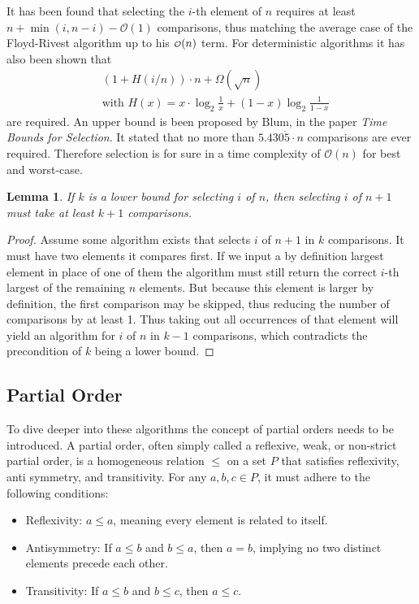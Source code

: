 \documentclass[10pt,journal,compsoc]{IEEEtran}
\newcommand\smallO{
  \mathchoice
    {{\scriptstyle\mathcal{O}}}%
    {{\scriptstyle\mathcal{O}}}%
    {{\scriptscriptstyle\mathcal{O}}}%
    {\scalebox{.50}{$\scriptscriptstyle\mathcal{O}$}}%
  }
\newtheorem{lemma}{Lemma}
\begin{document}
It has been found that selecting the $i$-th element of $n$ requires at least
$n+\min(i,n-i)-\mathcal{O}(1)$ comparisons, thus matching the average case of the Floyd-Rivest
algorithm up to his $\smallO(n)$ term. For deterministic algorithms it has also been shown that
\begin{eqnarray*}
  &\left (1 + H(i/n) \right ) \cdot n + \Omega(\sqrt n) \\
  &\text{with~} H(x) = x \cdot \log_2 \frac{1}{x} + (1-x) \log_2 \frac{1}{1-x}
\end{eqnarray*}
are required. An upper bound is been proposed by Blum, in the paper \textit{Time Bounds for
  Selection}. It stated that no more than $5.430\dot{5} \cdot n$ comparisons are ever required.
Therefore selection is for sure in a time complexity of $\mathcal{O}(n)$ for best and worst-case.

\begin{lemma}
  If $k$ is a lower bound for selecting $i$ of $n$, then selecting $i$ of $n+1$ must take at least $k+1$ comparisons.
\end{lemma}

\begin{proof}
  Assume some algorithm exists that selects $i$ of $n+1$ in $k$ comparisons. It must have two elements it compares first.
  If we input a by definition largest element in place of one of them the algorithm must still return the correct $i$-th
  largest of the remaining $n$ elements. But because this element is larger by definition, the first comparison may be
  skipped, thus reducing the number of comparisons by at least 1. Thus taking out all occurrences of that element will
  yield an algorithm for $i$ of $n$ in $k-1$ comparisons, which contradicts the precondition of $k$ being a lower bound.
\end{proof}


\subsection{Partial Order}
\label{sec:partial_order}
To dive deeper into these algorithms the concept of partial orders needs to be introduced. A partial
order, often simply called a reflexive, weak, or non-strict partial order, is a homogeneous relation
$\leq$ on a set $P$ that satisfies reflexivity, anti symmetry, and transitivity. For any $a, b, c
  \in P$, it must adhere to the following conditions:

\begin{itemize}
  \item Reflexivity: $a \leq a$, meaning every element is related to itself.
  \item Antisymmetry: If $a \leq b$ and $b \leq a$, then $a = b$, implying no two distinct elements
        precede each other.
  \item Transitivity: If $a \leq b$ and $b \leq c$, then $a \leq c$.
\end{itemize}
\end{document}
